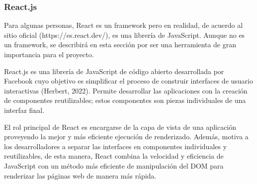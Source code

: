 \subsubsection{React.js}
Para algunas personas, React es un framework pero en realidad, de acuerdo al sitio oficial (https://es.react.dev/), es una librería de JavaScript. Aunque no es un framework, se describirá en esta sección por ser una herramienta de gran importancia para el proyecto.

React.js es una librería de JavaScript de código abierto desarrollada por Facebook cuyo objetivo es simplificar el proceso de construir interfaces de usuario interactivas (Herbert, 2022). Permite desarrollar las aplicaciones con la creación de componentes reutilizables; estos componentes son piezas individuales de una interfaz final.

El rol principal de React es encargarse de la capa de vista de una aplicación proveyendo la mejor y más eficiente ejecución de renderizado. Además, motiva a los desarrolladores a separar las interfaces en componentes individuales y reutilizables, de esta manera, React combina la velocidad y eficiencia de JavaScript con un método más eficiente de manipulación del DOM para renderizar las páginas web de manera más rápida.
